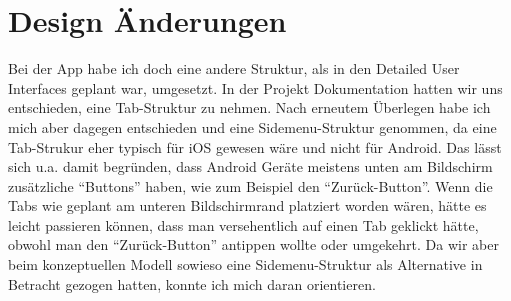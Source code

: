 \chapter{Design Änderungen}

Bei der App habe ich doch eine andere Struktur, als in den Detailed User Interfaces geplant war, umgesetzt. In der Projekt Dokumentation hatten wir uns entschieden, eine Tab-Struktur zu nehmen. Nach erneutem Überlegen habe ich mich aber dagegen entschieden und eine Sidemenu-Struktur genommen, da eine Tab-Strukur eher typisch für iOS gewesen wäre und nicht für Android. Das lässt sich u.a. damit begründen, dass Android Geräte meistens unten am Bildschirm zusätzliche ``Buttons'' haben, wie zum Beispiel den ``Zurück-Button''. Wenn die Tabs wie geplant am unteren Bildschirmrand platziert worden wären, hätte es leicht passieren können, dass man versehentlich auf einen Tab geklickt hätte, obwohl man den ``Zurück-Button'' antippen wollte oder umgekehrt. Da wir aber beim konzeptuellen Modell sowieso eine Sidemenu-Struktur als Alternative in Betracht gezogen hatten, konnte ich mich daran orientieren.